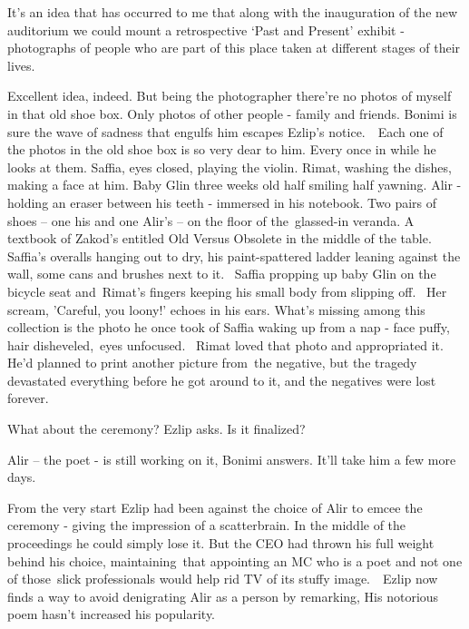 \documentclass[twoside,11pt]{book}
\begin{document}
{\textquotedbl}It's an idea that has occurred to me that along with the inauguration of the new auditorium we could
mount a retrospective `Past and Present' exhibit {}- photographs of people who are part of this place taken at
different stages of their lives.{\textquotedbl} 

{\textquotedbl}Excellent idea, indeed. But being the photographer there're no photos of myself in that old shoe box.
Only photos of other people - family and friends.{\textquotedbl} Bonimi is sure the wave of sadness that engulfs him
escapes Ezlip's notice.\ \ Each one of the photos in the old shoe box is so very dear to him. Every once in while he
looks at them. Saffia, eyes closed, playing the violin. Rimat, washing the dishes, making a face at him. Baby Glin
three weeks old half smiling half yawning. Alir - holding an eraser between his teeth - immersed in his notebook. Two
pairs of shoes -- one his and one Alir's -- on the floor of the\ glassed-in veranda. A textbook of Zakod's entitled
{\textquotedbl}Old Versus Obsolete{\textquotedbl} in the middle of the table. Saffia's overalls hanging out to dry, his
paint-spattered ladder leaning against the wall, some cans and brushes next to it. ~Saffia propping up baby Glin on the
bicycle seat and~Rimat's fingers keeping his small body from slipping off. ~Her scream, 'Careful, you loony!' echoes in
his ears. What's missing among this collection is the photo he once took of Saffia waking up from a nap - face puffy,
hair disheveled,{\ }{eyes
unfocused.} ~Rimat loved that photo and appropriated it. He'd planned to print another picture from~the negative, but
the tragedy devastated everything before he got around to it, and the negatives were lost forever.

{\textquotedbl}What about the ceremony?{\textquotedbl} Ezlip asks. {\textquotedbl}Is it finalized?{\textquotedbl} 

{\textquotedbl}Alir -- the poet - is still working on it,{\textquotedbl} Bonimi answers. {\textquotedbl}It'll take him a
few more days.{\textquotedbl} 

From the very start Ezlip had been against the choice of Alir to emcee the ceremony - giving the impression of a
scatterbrain. In the middle of the proceedings he could simply lose it. But the CEO had thrown his full weight behind
his choice, maintaining~that appointing an MC who is a poet and not one of those~slick professionals would help rid TV
of its stuffy image.{\ }~Ezlip now finds a way to avoid denigrating Alir as a person by remarking,
{\textquotedbl}His notorious poem hasn't increased his popularity.{\textquotedbl} 
\end{document}
